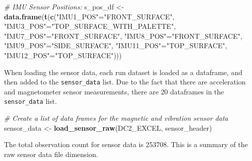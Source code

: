 \documentclass[]{article}
\newenvironment{Shaded}{\begin{snugshade}}{\end{snugshade}}
\newcommand{\CommentTok}[1]{\textcolor[rgb]{0.56,0.35,0.01}{\textit{#1}}}
\newcommand{\KeywordTok}[1]{\textcolor[rgb]{0.13,0.29,0.53}{\textbf{#1}}}
\newcommand{\NormalTok}[1]{#1}
\newcommand{\StringTok}[1]{\textcolor[rgb]{0.31,0.60,0.02}{#1}}
\begin{document}
\begin{Shaded}
\begin{Highlighting}[]
\CommentTok{# IMU Sensor Positions:}
\NormalTok{s_pos_df <-}\StringTok{ }\KeywordTok{data.frame}\NormalTok{(}\KeywordTok{t}\NormalTok{(}\KeywordTok{c}\NormalTok{(}\StringTok{"IMU1_POS"}\NormalTok{=}\StringTok{"FRONT_SURFACE"}\NormalTok{, }
                         \StringTok{"IMU3_POS"}\NormalTok{=}\StringTok{"TOP_SURFACE_WITH_PALETTE"}\NormalTok{,}
                         \StringTok{"IMU7_POS"}\NormalTok{=}\StringTok{"FRONT_SURFACE"}\NormalTok{, }
                         \StringTok{"IMU8_POS"}\NormalTok{=}\StringTok{"FRONT_SURFACE"}\NormalTok{, }
                         \StringTok{"IMU9_POS"}\NormalTok{=}\StringTok{"SIDE_SURFACE"}\NormalTok{, }
                         \StringTok{"IMU11_POS"}\NormalTok{=}\StringTok{"TOP_SURFACE"}\NormalTok{, }
                         \StringTok{"IMU12_POS"}\NormalTok{=}\StringTok{"TOP_SURFACE"}\NormalTok{)))}
\end{Highlighting}
\end{Shaded}

When loading the sensor data, each run dataset is loaded as a dataframe,
and then added to the \texttt{sensor\_data} list. Due to the fact that
there are acceleration and magnetometer sensor measurements, there are
20 dataframes in the \texttt{sensor\_data} list.

\begin{Shaded}
\begin{Highlighting}[]
\CommentTok{# Create a list of data frames for the magnetic and vibration sensor data }
\NormalTok{sensor_data <-}\StringTok{ }\KeywordTok{load_sensor_raw}\NormalTok{(DC2_EXCEL, sensor_header)}
\end{Highlighting}
\end{Shaded}

The total observation count for sensor data is 253708. This is a summary
of the raw sensor data file dimension.
\end{document}
